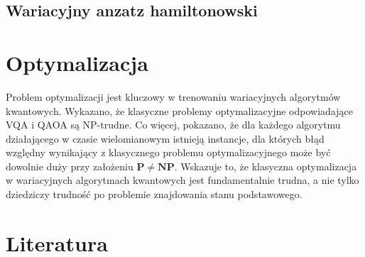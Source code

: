 \documentclass[a4paper,11pt]{article}
\begin{document}
\subsection{Wariacyjny anzatz hamiltonowski}


\newpage
\hypertarget{optymalizacja}{%
	\section{Optymalizacja}\label{optymalizacja}}


Problem optymalizacji jest kluczowy w trenowaniu wariacyjnych algorytmów kwantowych. Wykazano, że klasyczne problemy optymalizacyjne odpowiadające VQA i QAOA są NP-trudne. Co więcej, pokazano, że dla każdego algorytmu działającego w czasie wielomianowym istnieją instancje, dla których błąd względny wynikający z klasycznego problemu optymalizacyjnego może być dowolnie duży przy założeniu $\mathbf{P} \not= \mathbf{NP}$. Wskazuje to, że klasyczna optymalizacja w wariacyjnych algorytmach kwantowych jest fundamentalnie trudna, a nie tylko dziedziczy trudność po problemie znajdowania stanu podstawowego.


\newpage 






\newpage 

\hypertarget{literatura}{%
\section*{Literatura}\label{literatura}}
\end{document}
